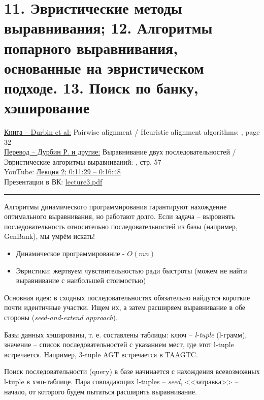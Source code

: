 \documentclass[a4paper,12pt]{article} %
\begin{document}
\section{11. Эвристические методы выравнивания; 12. Алгоритмы попарного выравнивания, основанные на эвристическом подходе. 13. Поиск по банку, хэширование}
\href{https://vk.com/doc155237002_518129852?hash=c14fcc0da730fc8e60}{Книга -- Durbin et al:} Pairwise alignment / Heuristic alignment algorithms: , page 32 \\
\href{https://vk.com/doc155237002_518129974?hash=8b75ee93da5460098c}{Перевод -- Дурбин Р. и другие:} Выравнивание двух последовательностей / Эвристические алгоритмы выравниваний: , стр. 57 \\
YouTube: \href{https://youtu.be/gGoYQBBEX8M?t=689}{Лекция 2; 0:11:29 -- 0:16:48} \\
Презентации в ВК: \href{https://vk.com/doc155237002_519204981?hash=9c4f1a66b95c4fd7fa}{lecture3.pdf}
\hrule \vspace{10pt}

Алгоритмы динамического программирования гарантируют нахождение оптимального выравнивания, но работают долго. Если задача -- выровнять последовательность относительно последовательностей из базы (например, GenBank), мы умрём искать!

\begin{itemize}
	\item Динамическое программирование - $O(mn)$
	\item Эвристики: жертвуем чувствительностью ради быстроты (можем не найти выравнивание с наибольшей стоимостью)
\end{itemize}
Основная идея: в сходных последовательностях обязательно найдутся короткие почти идентичные участки. Ищем их, а затем расширяем выравнивание в обе стороны (\textit{seed-and-extend approach}).

Базы данных хэшированы, т. е. составлены таблицы: ключ -- \textit{l-tuple} (l-грамм), значение -- список последовательностей с указанием мест, где этот l-tuple встречается. Например, 3-tuple AGT встречается в TAAGTC. 

Поиск последовательности (query) в базе начинается с нахождения всевозможных l-tuple в хэш-таблице. Пара совпадающих l-tuples -- \textit{seed}, <<затравка>> -- начало, от которого будем пытаться расширить выравнивание. 

\newpage
\end{document}
